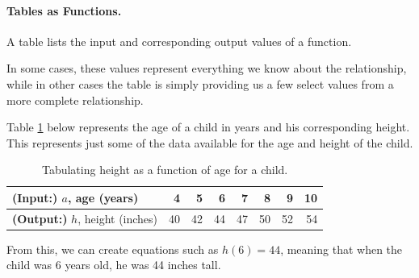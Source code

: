 \paragraph{Tables as Functions.}

A table lists the input and corresponding output values of a function.

In some cases, these values represent everything we know about the relationship, while in other cases the table is simply providing us a few select values from a more complete relationship.

Table \ref{tab:function} below represents the age of a child in years and his
corresponding height. This represents just some of the data available
for the age and height of the child.

\begin{table}[ht!]
\begin{centering}
\begin{tabular}{l*{7}{r}}
\toprule
{\bf (Input:)} $a$, age (years) & 4 & 5 & 6 & 7 & 8 & 9 & 10\\
\midrule
{\bf (Output:)} $h$, height (inches) & 40 & 42 & 44 & 47 & 50 & 52 & 54\\
\bottomrule
\end{tabular}
\caption{Tabulating height as a function of age for a child.}
\label{tab:function}
\end{centering}
\end{table}
From this, we can create equations such as $h(6) = 44$, meaning that when the child was 6 years old, he was 44 inches tall.


